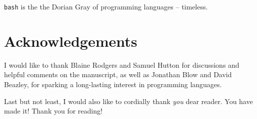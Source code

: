 \documentclass[aip,jcp,reprint,footinbib]{revtex4-1}
\let\tt\texttt
\begin{document}
\tt{bash} is the the Dorian Gray of programming languages -- timeless.

\section*{Acknowledgements}

I would like to thank Blaine Rodgers and Samuel Hutton for discussions and helpful comments on the manuscript, as well as Jonathan Blow and David Beazley, for sparking a long-lasting interest in programming languages.

Last but not least, I would also like to cordially thank \emph{you} dear reader. You have made it! Thank you for reading!

\nocite{*}


\end{document}
